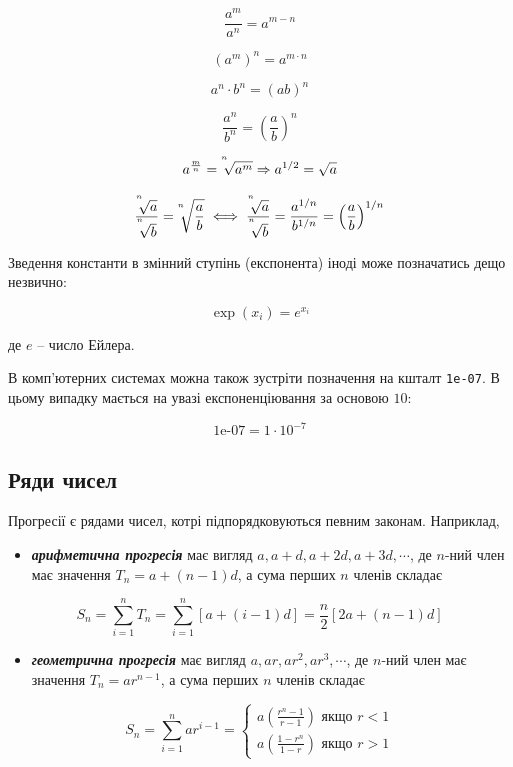 \documentclass[
  11pt,
]{book}
\providecommand{\tightlist}{%
  \setlength{\itemsep}{0pt}\setlength{\parskip}{0pt}}
\begin{document}
\[\frac{a^m}{a^n} = a^{m-n}\]

\[(a^m)^n = a^{m \cdot n}\]

\[a^n \cdot b^n = (ab)^n\]

\[\frac{a^n}{b^n} = \left( \frac{a}{b}\right)^n\]

\[a^{\frac{m}{n}} = \sqrt[\leftroot{5} \uproot{10} n]{a^m} \Rightarrow a^{1/2} = \sqrt{a}\]

\[\frac{\sqrt[\leftroot{5} \uproot{10} n]{a}}{\sqrt[\leftroot{5} \uproot{10} n]{b}} = \sqrt[\leftroot{5} \uproot{10} n]{\frac{a}{b}} \iff \frac{\sqrt[\leftroot{5} \uproot{10} n]{a}}{\sqrt[\leftroot{5} \uproot{10} n]{b}} = \frac{a^{1/n}}{b^{1/n}} = \left( \frac{a}{b} \right)^{1/n}\]

Зведення константи в змінний ступінь (експонента) іноді може позначатись дещо незвично:

\[\exp (x_i) = e^{x_i}\]

де \(e\) -- число Ейлера.

В комп'ютерних системах можна також зустріти позначення на кшталт \texttt{1e-07}. В цьому випадку мається на увазі експоненціювання за основою \(10\):

\[\text{1e-07} = 1 \cdot 10^{-7}\]

\subsection{Ряди чисел}\label{ux440ux44fux434ux438-ux447ux438ux441ux435ux43b}

Прогресії є рядами чисел, котрі підпорядковуються певним законам. Наприклад,

\begin{itemize}
\tightlist
\item
  \textbf{\emph{арифметична прогресія}} має вигляд \(a, a+d, a+2d, a+3d, \cdots\), де \(n\)-ний член має значення \(T_n = a + (n-1)d\), а сума перших \(n\) членів складає
\end{itemize}

\[S_n = \sum\limits_{i=1}^n T_n = \sum\limits_{i=1}^n \left[ a + (i-1)d \right] = \frac{n}{2}[2a+(n-1)d]\]

\begin{itemize}
\tightlist
\item
  \textbf{\emph{геометрична прогресія}} має вигляд \(a, ar, ar^2, ar^3, \cdots\), де \(n\)-ний член має значення \(T_n = ar^{n-1}\), а сума перших \(n\) членів складає
\end{itemize}

\[S_n = \sum\limits_{i=1}^n ar^{i-1} = \begin{cases}
a \left( \frac{r^n - 1}{r-1} \right) \text{ якщо } r<1 \\
a \left( \frac{1-r^n}{1-r} \right) \text{ якщо } r>1
\end{cases}\]
\end{document}
